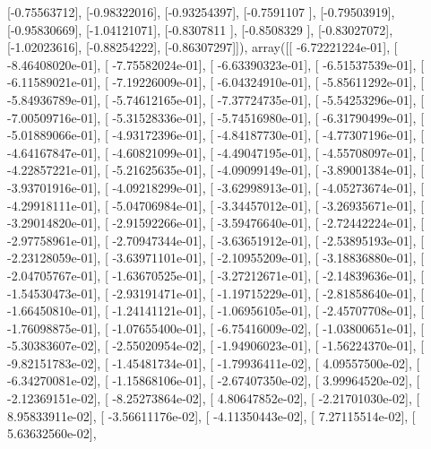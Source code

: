 \documentclass{article}
\begin{document}
       [-0.75563712],
       [-0.98322016],
       [-0.93254397],
       [-0.7591107 ],
       [-0.79503919],
       [-0.95830669],
       [-1.04121071],
       [-0.8307811 ],
       [-0.8508329 ],
       [-0.83027072],
       [-1.02023616],
       [-0.88254222],
       [-0.86307297]]), array([[ -6.72221224e-01],
       [ -8.46408020e-01],
       [ -7.75582024e-01],
       [ -6.63390323e-01],
       [ -6.51537539e-01],
       [ -6.11589021e-01],
       [ -7.19226009e-01],
       [ -6.04324910e-01],
       [ -5.85611292e-01],
       [ -5.84936789e-01],
       [ -5.74612165e-01],
       [ -7.37724735e-01],
       [ -5.54253296e-01],
       [ -7.00509716e-01],
       [ -5.31528336e-01],
       [ -5.74516980e-01],
       [ -6.31790499e-01],
       [ -5.01889066e-01],
       [ -4.93172396e-01],
       [ -4.84187730e-01],
       [ -4.77307196e-01],
       [ -4.64167847e-01],
       [ -4.60821099e-01],
       [ -4.49047195e-01],
       [ -4.55708097e-01],
       [ -4.22857221e-01],
       [ -5.21625635e-01],
       [ -4.09099149e-01],
       [ -3.89001384e-01],
       [ -3.93701916e-01],
       [ -4.09218299e-01],
       [ -3.62998913e-01],
       [ -4.05273674e-01],
       [ -4.29918111e-01],
       [ -5.04706984e-01],
       [ -3.34457012e-01],
       [ -3.26935671e-01],
       [ -3.29014820e-01],
       [ -2.91592266e-01],
       [ -3.59476640e-01],
       [ -2.72442224e-01],
       [ -2.97758961e-01],
       [ -2.70947344e-01],
       [ -3.63651912e-01],
       [ -2.53895193e-01],
       [ -2.23128059e-01],
       [ -3.63971101e-01],
       [ -2.10955209e-01],
       [ -3.18836880e-01],
       [ -2.04705767e-01],
       [ -1.63670525e-01],
       [ -3.27212671e-01],
       [ -2.14839636e-01],
       [ -1.54530473e-01],
       [ -2.93191471e-01],
       [ -1.19715229e-01],
       [ -2.81858640e-01],
       [ -1.66450810e-01],
       [ -1.24141121e-01],
       [ -1.06956105e-01],
       [ -2.45707708e-01],
       [ -1.76098875e-01],
       [ -1.07655400e-01],
       [ -6.75416009e-02],
       [ -1.03800651e-01],
       [ -5.30383607e-02],
       [ -2.55020954e-02],
       [ -1.94906023e-01],
       [ -1.56224370e-01],
       [ -9.82151783e-02],
       [ -1.45481734e-01],
       [ -1.79936411e-02],
       [  4.09557500e-02],
       [ -6.34270081e-02],
       [ -1.15868106e-01],
       [ -2.67407350e-02],
       [  3.99964520e-02],
       [ -2.12369151e-02],
       [ -8.25273864e-02],
       [  4.80647852e-02],
       [ -2.21701030e-02],
       [  8.95833911e-02],
       [ -3.56611176e-02],
       [ -4.11350443e-02],
       [  7.27115514e-02],
       [  5.63632560e-02],
\end{document}
